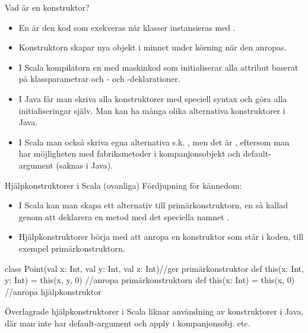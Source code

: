 \begin{Slide}{Vad är en konstruktor?}
\begin{itemize}
\item En  är den kod som exekveras när klasser instansieras med .

\item Konstruktorn skapar nya objekt i minnet under körning när den anropas.

\item I Scala  kompilatorn en  med maskinkod som initialiserar alla attribut baserat på klassparametrar och - och -deklarationer.

\pause

\item I Java får man  skriva alla konstruktorer med speciell syntax och göra alla initialiseringar själv. Man kan ha många olika alternativa konstruktorer i Java.

\item I Scala  man också skriva egna alternativa s.k. , men det är , eftersom man har möjligheten med fabriksmetoder i kompanjonsobjekt och default-argument (saknas i Java).
\end{itemize}
\end{Slide}


\begin{Slide}{Hjälpkonstruktorer i Scala (ovanliga)}%
Fördjupning för kännedom:
\begin{itemize}
\item I Scala kan man skapa ett alternativ till primärkonstruktorn, en så kallad   genom att deklarera en metod med det speciella namnet .


\item Hjälpkonstruktorer  börja med att anropa en  konstruktor som står  i koden, till exempel primärkonstruktorn.
\end{itemize}

\begin{Code}
class Point(val x: Int, val y: Int, val z: Int){//ger primärkonstruktor
  def this(x: Int, y: Int) = this(x, y, 0) //anropa primärkonstruktorn
  def this(x: Int) = this(x, 0) //anropa hjälpkonstruktor
}
\end{Code}

{\SlideFontSmall Överlagrade hjälpkonstruktorer i Scala liknar användning av konstruktorer i Java, där man inte har default-argument och apply i kompanjonsobj. etc.}

\end{Slide}

